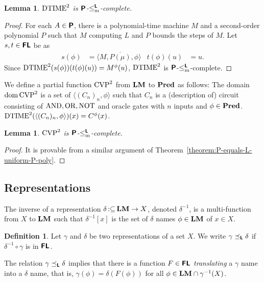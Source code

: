 \documentclass{article}
\newtheorem{lemma}[theorem]{Lemma}
\theoremstyle{definition}
\newtheorem{definition}[theorem]{Definition}
\theoremstyle{remark}
\newcommand{\pcolon}{\mathpunct{\,:\subseteq}}
\begin{document}
\begin{lemma}
 $\mathrm{DTIME}^2$ is $\text{\bfseries \sffamily \upshape P}$-$\leq _{\mathrm{m}} ^{\text{\bfseries \sffamily \upshape L}}$-complete.
\end{lemma}

\begin{proof}
 For each $A \in \text{\bfseries \sffamily \upshape P}$, there is a polynomial-time machine $M$ and a second-order polynomial $P$ such that $M$ computing $L$ and $P$ bounds the steps of $M$.
 Let $s, t \in \text{\bfseries \sffamily \upshape FL}$ be as
 \begin{align}
  s(\phi) &= \langle M, \overline{P(\mu)}, \phi \rangle
  &
  t(\phi)(u) &= u.
 \end{align}
 Since  $\mathrm{DTIME}^2(s(\phi))(t(\phi)(u)) = M^\phi (u)$,
 $\mathrm{DTIME}^2$ is $\text{\bfseries \sffamily \upshape P}$-$\leq _{\mathrm{m}} ^{\text{\bfseries \sffamily \upshape L}}$-complete.
\end{proof}


We define a partial function  $\mathrm{CVP}^2$ from $\mathbf{LM}$ to $\mathbf{Pred}$ as follows:
The domain $\mathop{\rm dom} \mathrm{CVP}^2$ is a set of $\langle (C_n)_n, \phi \rangle$
such that $C_n$ is a (description of) circuit consisting of $\mathrm{AND}, \mathrm{OR}, \mathrm{NOT}$
and oracle gates with $n$ inputs and $\phi \in \mathbf{Pred}$.
$\mathrm{DTIME}^2(\langle (C_n)_n,  \phi \rangle)(x) = C^\phi(x)$.

\begin{lemma}
 $\mathrm{CVP}^2$ is $\text{\bfseries \sffamily \upshape P}$-$\leq _{\mathrm{m}} ^{\text{\bfseries \sffamily \upshape L}}$-complete.
\end{lemma}

\begin{proof}
 It is provable from a similar argument of Theorem~\ref{theorem:P-equals-L-uniform-P-poly}.
\end{proof}



\subsection{Representations}
\newcommand{\transL}{\preceq_\classLtwo}


The inverse of a representation $\delta \pcolon \LM \to X$, 
denoted $\delta^{-1}$, is a multi-function from $X$ to $\mathbf{LM}$ such that 
$\delta^{-1}[x]$ is the set of $\delta$ names $\phi \in \mathbf{LM}$ of $x \in X$.


\begin{definition}
Let $\gamma$ and $\delta$ be two representations of a set $X$.
We write $\gamma \transL \delta$ if
$\delta^{-1} \circ \gamma$ is in $\text{\bfseries \sffamily \upshape FL}$.
\end{definition}
The relation $\gamma \transL \delta$ implies that
there is a function $F \in \text{\bfseries \sffamily \upshape FL}$ \emph{translating} a $\gamma$ name
into a $\delta$ name, that is, $\gamma(\phi) = \delta(F(\phi))$ 
for all $\phi \in \mathbf{LM} \cap \gamma^{-1}(X)$.
\end{document}
